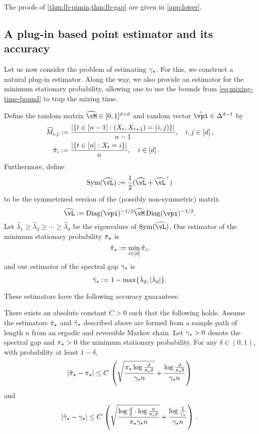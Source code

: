 The proofs of \cref{thm:lb-pimin,thm:lb-gap} are given in
\cref{app:lower}. 

\subsection{A plug-in based point estimator and its accuracy}
\label{sec:rates-upper}
Let us now consider the problem of estimating $\gamma_{\star}$.
For this, we construct a natural plug-in estimator.
Along the way, we also provide an estimator for the minimum stationary probability,
allowing one to use the bounds from \cref{eq:mixing-time-bound} to trap
the mixing time.

Define the random matrix $\wh\vM \in [0,1]^{d \times d}$ and random
vector $\hat\vpi \in \Delta^{d-1}$ by
\begin{align*}
  \widehat{M}_{i,j}
  & := \frac{|\{ t \in [n-1] : (X_t,X_{t+1}) = (i,j) \}|}{n-1}
  , \quad i,j \in [d]\,,
  \\
  \hat{\pi}_i
  & := \frac{|\{ t \in [n] : X_t = i \}|}{n}
  , \quad i \in [d]
  \,.
\end{align*}
Furthermore, define
\[
  \Sym(\wh\vL) := \frac12 \parens{ \wh\vL + \wh\vL^\t }
\]
to be the symmetrized version of the (possibly non-symmetric) matrix
\[
  \wh\vL := \Diag(\hat\vpi)^{-1/2} \wh\vM \Diag(\hat\vpi)^{-1/2}
  .
\]
Let $\hat\lambda_1 \geq \hat\lambda_2 \geq \dotsb \geq \hat\lambda_d$
be the eigenvalues of $\Sym(\wh\vL)$.
Our estimator of the minimum stationary probability $\pi_{\star}$ is
\[
  \hat\pi_{\star} := \min_{i \in [d]} \hat\pi_i ,
\]
and our estimator of the spectral gap $\gamma_{\star}$ is
\[
  \hat\gamma_{\star} := 1 - \max\{ \hat\lambda_2, |\hat\lambda_d| \} .
\]

These estimators have the following accuracy guarantees:
\begin{theorem}
  \label{thm:err}
  There exists an absolute constant $C>0$ such that the following
  holds.
  Assume the estimators $\hat\pi_{\star}$ and $\hat\gamma_{\star}$ described above are
  formed from a sample path of length $n$ from an ergodic and
  reversible Markov chain.
  Let $\gamma_{\star}>0$ denote the spectral gap and $\pi_{\star}>0$ the minimum
  stationary probability.
  For any $\delta \in (0,1)$, with probability at least $1-\delta$,
  \begin{equation}\label{eq:piminbound}
    \left|\hat\pi_{\star}-\pi_{\star}\right|
    \le
    C \,
    \left(
      \sqrt{\frac{\pi_{\star}\log\frac{d}{\pi_{\star}\delta}}{\gamma_{\star} n}}
      +
      \frac{\log\frac{d}{\pi_{\star}\delta}}{\gamma_{\star} n}
    \right)
  \end{equation}
  and
  \begin{equation}\label{eq:gapbound}
    \left|\hat\gamma_{\star}-\gamma_{\star}\right|
    \leq
    C \,
    \left(
      \sqrt{\frac{\log\frac{d}{\delta}\cdot\log\frac{n}{\pi_{\star}\delta}}{\pi_{\star}\gamma_{\star} n}}
      + \frac{\log\frac{1}{\gamma_{\star}}}{\gamma_{\star} n}  
    \right)
    \,.
  \end{equation}
\end{theorem}

